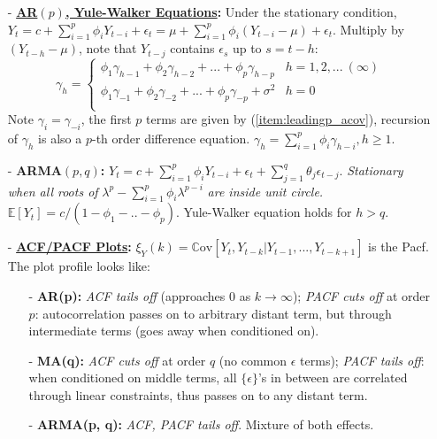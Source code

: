 \documentclass[9pt, landscape]{article}
\begin{document}
\begin{multicols*}{3}
\begin{itemize}
\begin{itemize}[leftmargin=10pt,noitemsep,topsep=0pt,partopsep=0pt]
		\item[-] \textbf{\href{https://en.wikipedia.org/wiki/Autoregressive_model}{AR$(p)$, Yule-Walker Equations}:} Under the stationary condition, $Y_t = c + \sum_{i=1}^p \phi_i Y_{t-i} + \epsilon_t = \mu + \sum_{i=1}^p \phi_i (Y_{t-i}-\mu) + \epsilon_t$. Multiply by $(Y_{t-h}-\mu)$, note that $Y_{t-j}$ contains $\epsilon_s$ up to $s=t-h$:
		{\scriptsize$$
			\gamma_h = \begin{cases}
			\phi_1 \gamma_{h-1} + \phi_2 \gamma_{h-2} + ... + \phi_p \gamma_{h-p} & h = 1, 2, ...~ (\infty)\\
			\phi_1 \gamma_{-1} + \phi_2 \gamma_{-2} + ... + \phi_p \gamma_{-p} + \sigma^2 & h = 0 \\
			\end{cases}
		$$}
		Note $\gamma_i = \gamma_{-i}$, the first $p$ terms are given by (\ref{item:leadingp_acov}), recursion of $\gamma_h$ is also a $p$-th order difference equation. $\gamma_h = \sum_{i=1}^p \phi_i \gamma_{h-i}, h\geq 1$.
		\item[-] \textbf{ARMA$(p, q)$:} $Y_t = c + \sum_{i=1}^p \phi_i Y_{t-i} + \epsilon_t + \sum_{j=1}^q \theta_j \epsilon_{t-j}$. \textit{Stationary when all roots of} $\lambda^p - \sum_{i=1}^p \phi_i \lambda^{p-i}$ \textit{are inside unit circle.}\\
		$\mathbb{E}\left[Y_t\right] = c/(1-\phi_1 - .. - \phi_p)$. Yule-Walker equation holds for $h > q$.
		\item[-] \textbf{\href{https://people.duke.edu/~rnau/411arim3.htm}{ACF/PACF Plots}:} $\xi_Y(k) = \mathrm{\mathbb{C}ov}\left[Y_t, Y_{t-k}|Y_{t-1}, ..., Y_{t-k+1}\right]$ is the Pacf. The plot profile looks like:
		\begin{itemize}[leftmargin=10pt,noitemsep,topsep=0pt,partopsep=0pt]
			\item[-] \textbf{AR(p):} \textit{ACF tails off} (approaches 0 as $k\to \infty$); \textit{PACF cuts off} at order $p$: autocorrelation passes on to arbitrary distant term, but through intermediate terms (goes away when conditioned on).
			\item[-] \textbf{MA(q):} \textit{ACF cuts off} at order $q$ (no common $\epsilon$ terms); \textit{PACF tails off}: when conditioned on middle terms, all $\{\epsilon\}$'s in between are correlated through linear constraints, thus passes on to any distant term.
			\item[-] \textbf{ARMA(p, q):} \textit{ACF, PACF tails off}. Mixture of both effects.
		\end{itemize}
	\end{itemize}

\end{itemize}
\end{multicols*}
\end{document}
